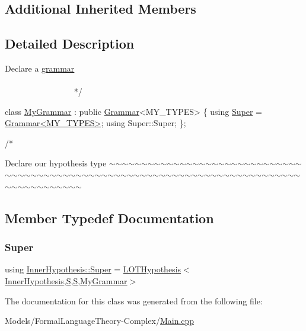 \subsection*{Additional Inherited Members}


\subsection{Detailed Description}

\begin{DoxyCode}
    Declare a \hyperlink{class_l_o_t_hypothesis_affae32db28c39df676809ae47e14e7cf}{grammar}
   ~~~~~~~~~~~~~~~~~~~~~~~~~~~~~~~~~~~~~~~~~~~~~~~~~~~~~~~~~~~~~~~~~~~~~~~~~~~~~~~~~~~~~~~~ */



\textcolor{keyword}{class }\hyperlink{class_my_grammar}{MyGrammar} : \textcolor{keyword}{public} \hyperlink{class_grammar}{Grammar}<MY\_TYPES> \{
    \textcolor{keyword}{using} \hyperlink{class_inner_hypothesis_a1a69a8dd433b64b725be0b2436d6df0c}{Super} = \hyperlink{class_grammar}{Grammar<MY\_TYPES>};
    \textcolor{keyword}{using} Super::Super;
\};

\textcolor{comment}{/*}
\end{DoxyCode}
 Declare our hypothesis type $\sim$$\sim$$\sim$$\sim$$\sim$$\sim$$\sim$$\sim$$\sim$$\sim$$\sim$$\sim$$\sim$$\sim$$\sim$$\sim$$\sim$$\sim$$\sim$$\sim$$\sim$$\sim$$\sim$$\sim$$\sim$$\sim$$\sim$$\sim$$\sim$$\sim$$\sim$$\sim$$\sim$$\sim$$\sim$$\sim$$\sim$$\sim$$\sim$$\sim$$\sim$$\sim$$\sim$$\sim$$\sim$$\sim$$\sim$$\sim$$\sim$$\sim$$\sim$$\sim$$\sim$$\sim$$\sim$$\sim$$\sim$$\sim$$\sim$$\sim$$\sim$$\sim$$\sim$$\sim$$\sim$$\sim$$\sim$$\sim$$\sim$$\sim$$\sim$$\sim$$\sim$$\sim$$\sim$$\sim$$\sim$$\sim$$\sim$$\sim$$\sim$$\sim$$\sim$$\sim$$\sim$$\sim$$\sim$$\sim$ 

\subsection{Member Typedef Documentation}
\mbox{\label{class_inner_hypothesis_a1a69a8dd433b64b725be0b2436d6df0c}} 
\subsubsection{\texorpdfstring{Super}{Super}}
{\footnotesize\ttfamily using \hyperlink{class_inner_hypothesis_a1a69a8dd433b64b725be0b2436d6df0c}{Inner\+Hypothesis\+::\+Super} =  \hyperlink{class_l_o_t_hypothesis}{L\+O\+T\+Hypothesis}$<$\hyperlink{class_inner_hypothesis}{Inner\+Hypothesis},\hyperlink{_formal_language_theory-_complex_2_main_8cpp_a51c40915539205f0b5add30b0d68a4cb}{S},\hyperlink{_formal_language_theory-_complex_2_main_8cpp_a51c40915539205f0b5add30b0d68a4cb}{S},\hyperlink{class_my_grammar}{My\+Grammar}$>$}



The documentation for this class was generated from the following file\+:\begin{DoxyCompactItemize}
\item 
Models/\+Formal\+Language\+Theory-\/\+Complex/\hyperlink{_formal_language_theory-_complex_2_main_8cpp}{Main.\+cpp}\end{DoxyCompactItemize}

